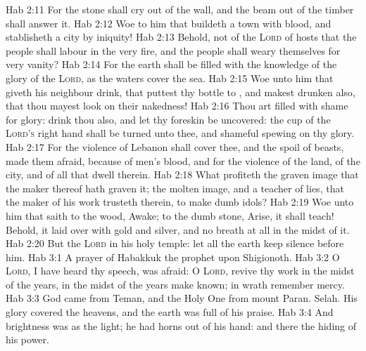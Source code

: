 \vs Hab 2:11 For the stone shall cry out of the wall, and the beam out of the timber shall answer it.
\vs Hab 2:12 Woe to him that buildeth a town with blood, and stablisheth a city by iniquity!
\vs Hab 2:13 Behold,  not of the \textsc{Lord} of hosts that the people shall labour in the very fire, and the people shall weary themselves for very vanity?
\vs Hab 2:14 For the earth shall be filled with the knowledge of the glory of the \textsc{Lord}, as the waters cover the sea.
\vs Hab 2:15 Woe unto him that giveth his neighbour drink, that puttest thy bottle to , and makest  drunken also, that thou mayest look on their nakedness!
\vs Hab 2:16 Thou art filled with shame for glory: drink thou also, and let thy foreskin be uncovered: the cup of the \textsc{Lord's} right hand shall be turned unto thee, and shameful spewing  on thy glory.
\vs Hab 2:17 For the violence of Lebanon shall cover thee, and the spoil of beasts,  made them afraid, because of men's blood, and for the violence of the land, of the city, and of all that dwell therein.
\vs Hab 2:18 What profiteth the graven image that the maker thereof hath graven it; the molten image, and a teacher of lies, that the maker of his work trusteth therein, to make dumb idols?
\vs Hab 2:19 Woe unto him that saith to the wood, Awake; to the dumb stone, Arise, it shall teach! Behold, it  laid over with gold and silver, and  no breath at all in the midst of it.
\vs Hab 2:20 But the \textsc{Lord}  in his holy temple: let all the earth keep silence before him.
\vs Hab 3:1 A prayer of Habakkuk the prophet upon Shigionoth.
\vs Hab 3:2 O \textsc{Lord}, I have heard thy speech,  was afraid: O \textsc{Lord}, revive thy work in the midst of the years, in the midst of the years make known; in wrath remember mercy.
\vs Hab 3:3 God came from Teman, and the Holy One from mount Paran. Selah. His glory covered the heavens, and the earth was full of his praise.
\vs Hab 3:4 And  brightness was as the light; he had horns  out of his hand: and there  the hiding of his power.
